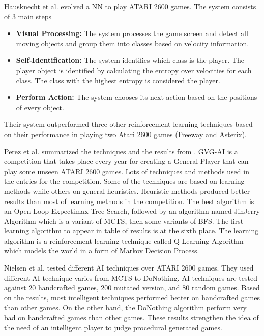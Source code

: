 Hausknecht et al.\cite{hyperNEAT} evolved a NN to play ATARI 2600 games. The system consists of 3 main steps
\begin{itemize} \itemsep0pt \parskip0pt 
	\item \textbf{Visual Processing:} The system processes the game screen and detect all moving objects and group them into classes based on velocity information.
	\item \textbf{Self-Identification:} The system identifies which class is the player. The player object is identified by calculating the entropy over velocities for each class. The class with the highest entropy is considered the player.
	\item \textbf{Perform Action:} The system chooses its next action based on the positions of every object.
\end{itemize}
Their system outperformed three other reinforcement learning techniques based on their performance in playing two Atari 2600 games (Freeway and Asterix).\\\par

Perez et al.\cite{mcts, gvgai2014} summarized the techniques and the results from \cite{gvgaiWebsite}. GVG-AI is a competition that takes place every year for creating a General Player that can play some unseen ATARI 2600 games. Lots of techniques and methods used in the entries for the competition. Some of the techniques are based on learning methods while others on general heuristics. Heuristic methods produced better results than most of learning methods in the competition. The best algorithm is an Open Loop Expectimax Tree Search, followed by an algorithm named JinJerry Algorithm which is a variant of MCTS, then some variants of BFS. The first learning algorithm to appear in table of results is at the sixth place. The learning algorithm is a reinforcement learning technique called Q-Learning Algorithm which models the world in a form of Markov Decision Process.\\\par

Nielsen et al.\cite{gvgpPerformanceProfiles} tested different AI techniques over ATARI 2600 games. They used different AI technique varies from MCTS to DoNothing. AI techniques are tested against 20 handcrafted games, 200 mutated version, and 80 random games. Based on the results, most intelligent techniques performed better on handcrafted games than other games. On the other hand, the DoNothing algorithm perform very bad on handcrafted games than other games. These results strengthen the idea of the need of an intelligent player to judge procedural generated games.